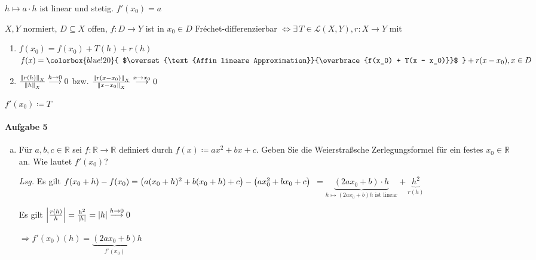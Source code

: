 \documentclass{scrreprt}
\begin{document}
$h \mapsto a \cdot h$ ist linear und stetig. $f'(x_0) = a$


$X, Y$ normiert, $D \subseteq X$ offen, $f \colon D \to Y$ ist in $x_0 \in D$
Fréchet-differenzierbar $\iff \exists \, T \in \mathcal{L}(X, Y), r \colon X \to Y$
mit
\begin{enumerate}
\item $f(x_0) = f(x_0) + T(h) + r(h)$ \\
  $f(x) = \colorbox{blue!20}{
    $\overset{\text{Affin lineare Approximation}}{\overbrace{f(x_0) + T(x - x_0)}}$
  } + r(x - x_0), x \in D$
\item $\frac{\norm{r(h)}_X}{\norm{h}_X} \overset{h \to 0}\longrightarrow 0$
  bzw. $\frac{\norm{r(x - x_0)}_X}{\norm{x - x_0}_X} \overset{x \to x_0}\longrightarrow 0$
\end{enumerate}
$f'(x_0) \coloneqq T$

\paragraph{Aufgabe 5}
\begin{enumerate}[a)]
\item Für $a, b, c \in \mathbb{R}$ sei $f \colon \mathbb{R} \to \mathbb{R}$
  definiert durch $f(x) \coloneqq ax^2 + bx + c$.
  Geben Sie die Weierstraßsche Zerlegungsformel für ein festes
  $x_0 \in \mathbb{R}$ an.
  Wie lautet $f'(x_0)$?

  \textit{Lsg.}
  Es gilt $f(x_0 + h) - f(x_0) = \qty(a(x_0 + h)^2 + b(x_0 + h) + c)
  - \qty(ax_0^2 + bx_0 + c)$
  $= \underset{h \mapsto (2ax_0 + b)h  \text{ ist linear}}{\underbrace{(2ax_0 + b) \cdot h}} + \underset{r(h)}{\underbrace{h^2}}$

  Es gilt $\abs{\frac{r(h)}{h}} = \frac{h^2}{\abs{h}} = \abs{h} \overset{h \to 0}\longrightarrow 0$

  $\Rightarrow f'(x_0)(h) = \underset{f'(x_0)}{\underbrace{(2ax_0 + b)}} h$
\end{enumerate}
\end{document}
